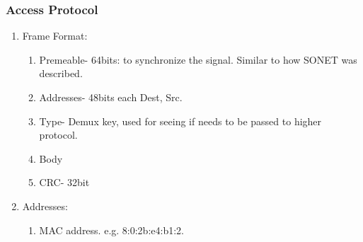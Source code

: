 \documentclass[11pt, a4paper]{article}
\begin{document}
\subsubsection{Access Protocol}
\begin{enumerate}
    \item Frame Format:
    \begin{enumerate}
        \item Premeable- 64bits: to synchronize the signal. Similar to how SONET was described.
        \item Addresses- 48bits each Dest, Src.
        \item Type- Demux key, used for seeing if needs to be passed to higher protocol.
        \item Body
        \item CRC- 32bit
    \end{enumerate}
    \item Addresses:
    \begin{enumerate}
        \item MAC address. e.g. 8:0:2b:e4:b1:2.
    \end{enumerate}
\end{enumerate}
\end{document}
